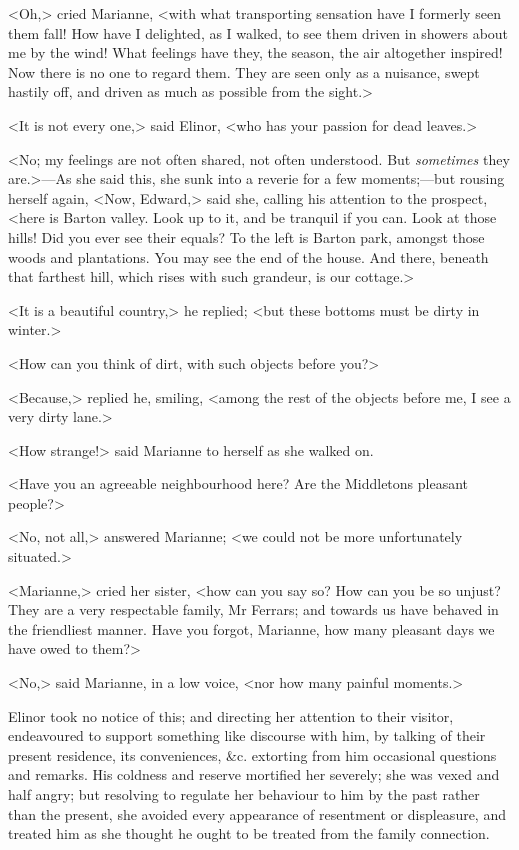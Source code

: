 <Oh,> cried Marianne, <with what transporting sensation have I formerly seen them fall! How have I delighted, as I walked, to see them driven in showers about me by the wind! What feelings have they, the season, the air altogether inspired! Now there is no one to regard them. They are seen only as a nuisance, swept hastily off, and driven as much as possible from the sight.>

<It is not every one,> said Elinor, <who has your passion for dead leaves.>

<No; my feelings are not often shared, not often understood. But \textit{sometimes} they are.>—As she said this, she sunk into a reverie for a few moments;—but rousing herself again, <Now, Edward,> said she, calling his attention to the prospect, <here is Barton valley. Look up to it, and be tranquil if you can. Look at those hills! Did you ever see their equals? To the left is Barton park, amongst those woods and plantations. You may see the end of the house. And there, beneath that farthest hill, which rises with such grandeur, is our cottage.>

<It is a beautiful country,> he replied; <but these bottoms must be dirty in winter.>

<How can you think of dirt, with such objects before you?>

<Because,> replied he, smiling, <among the rest of the objects before me, I see a very dirty lane.>

<How strange!> said Marianne to herself as she walked on.

<Have you an agreeable neighbourhood here? Are the Middletons pleasant people?>

<No, not all,> answered Marianne; <we could not be more unfortunately situated.>

<Marianne,> cried her sister, <how can you say so? How can you be so unjust? They are a very respectable family, Mr Ferrars; and towards us have behaved in the friendliest manner. Have you forgot, Marianne, how many pleasant days we have owed to them?>

<No,> said Marianne, in a low voice, <nor how many painful moments.>

Elinor took no notice of this; and directing her attention to their visitor, endeavoured to support something like discourse with him, by talking of their present residence, its conveniences, \&c. extorting from him occasional questions and remarks. His coldness and reserve mortified her severely; she was vexed and half angry; but resolving to regulate her behaviour to him by the past rather than the present, she avoided every appearance of resentment or displeasure, and treated him as she thought he ought to be treated from the family connection.